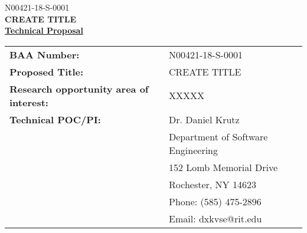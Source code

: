 \documentclass[12pt]{article}
\newcommand{\Title}{CREATE TITLE}
\newcommand{\CallNumber}{N00421-18-S-0001} %
\newcommand{\CallName}{XXXX}
\begin{document}
\begin{titlepage}

\newcommand{\HRule}{\rule{\linewidth}{0.3mm}} %




\noindent\large \CallNumber\\[.20cm] %

\noindent \LARGE \textbf{\Title}\\[.10cm] 


\noindent \large  \underline{\textbf{Technical Proposal}}\\ [.15cm] 

\begin{tabular}{ L{50mm} L{100mm} }



\normalsize \textbf{BAA Number:} & \normalsize \CallNumber  \\


\normalsize \textbf{Proposed Title:} & \normalsize  \Title  \\ 
\normalsize \textbf{Research opportunity area of interest:} & \normalsize  XXXXX  \\ 


\normalsize \textbf{Technical POC/PI:} & \normalsize  Dr. Daniel Krutz \\
 & \vspace{-2mm} \normalsize Department of Software Engineering
 \\

   & \vspace{-4mm} \normalsize 152 Lomb Memorial Drive \\
   & \vspace{-6mm} \normalsize Rochester, NY 14623 \\
   & \vspace{-8mm} \normalsize Phone: (585) 475-2896 \\
   & \vspace{-10mm} \normalsize Email: dxkvse@rit.edu \\




\end{tabular}
\end{titlepage}
\end{document}
